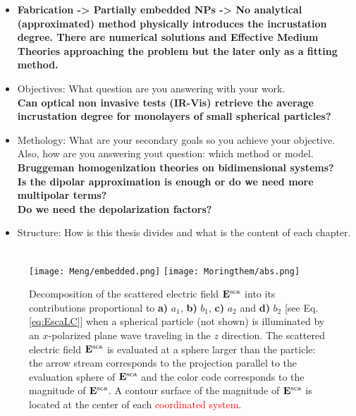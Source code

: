 \begin{itemize}
	\item \textbf{Fabrication -> Partially embedded NPs -> No analytical (approximated) method physically introduces the incrustation degree. There are numerical solutions and Effective Medium Theories approaching the problem but the later only as a fitting method. }
	\item Objectives: What question are you answering with your work.\\
	\textbf{Can optical non invasive tests (IR-Vis) retrieve the average incrustation degree for monolayers of small spherical particles?}
	\item Methology: What are your secondary goals so you achieve your objective. Also, how are you answering yout question: which method or model.\\
	\textbf{Bruggeman homogenization theories on bidimensional systems?\\
	Is the dipolar approximation is enough or do we need more multipolar terms?\\
	Do we need the depolarization factors?}
	\item Structure: How is this thesis divides and what is the content of each chapter.
\end{itemize}






\begin{figure}[h!]\centering
\hspace*{-.795\textwidth}
    \begin{subfigure}{1.075\textwidth}\caption{\hfill }\label{sfig:back:1}\end{subfigure}%
  	\begin{subfigure}{.19\textwidth}\caption{\hfill }\label{sfig:back:2}\end{subfigure}\\[-1.225em]
  	\texttt{[image: Meng/embedded.png]}%
  		\hspace*{1em}
  	 \texttt{[image: Moringthem/abs.png]}
  \caption[Multipolar Contributions to the Scattered Electric Field]{ Decomposition of the  scattered electric field $\vb{E}^\text{sca}$ into its contributions  proportional to \textbf{a)} $a_1$,  \textbf{b)}  $b_1$, \textbf{c)} $a_2$ and \textbf{d)} $b_2$ [see Eq. \eqref{eq:EscaLC}] when a spherical particle (not shown) is illuminated by an $x$-polarized plane wave traveling in the $z$ direction. The scattered electric field $\vb{E}^\text{sca}$ is evaluated at a sphere larger than the particle: the arrow stream corresponds to the projection parallel to the evaluation sphere of $\vb{E}^\text{sca}$  and the color code corresponds to the magnitude of  $\vb{E}^\text{sca}$. A contour surface of the magnitude of $\vb{E}^\text{sca}$ is located at the center of each \textcolor{red}{coordinated system}. }
\label{fig:Multipoles}
\end{figure}















